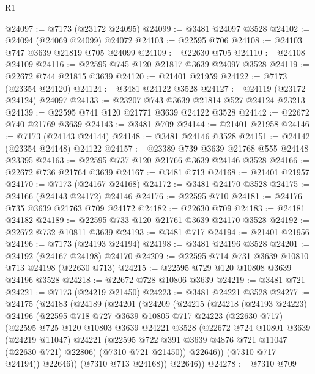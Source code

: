 \begin{lexlean}{R1}
\begin{coremodule}
@24097 := @7173 (@23172 @24095)
@24099 := @3481 @24097 @3528
@24102 := @24094 (@24069 @24099) @24072
@24103 := @22595 @706
@24108 := @24103 @747 @3639 @21819 @705 @24099
@24109 := @22630 @705
@24110 := @24108 @24109
@24116 := @22595 @745 @120 @21817 @3639 @24097 @3528
@24119 := @22672 @744 @21815 @3639
@24120 := @21401 @21959
@24122 := @7173 (@23354 @24120)
@24124 := @3481 @24122 @3528
@24127 := @24119 (@23172 @24124) @24097
@24133 := @23207 @743 @3639 @21814 @527 @24124 @23213
@24139 := @22595 @741 @120 @21771 @3639 @24122 @3528
@24142 := @22672 @740 @21769 @3639
@24143 := @3481 @709
@24144 := @21401 @21958
@24146 := @7173 (@24143 @24144)
@24148 := @3481 @24146 @3528
@24151 := @24142 (@23354 @24148) @24122
@24157 := @23389 @739 @3639 @21768 @555 @24148 @23395
@24163 := @22595 @737 @120 @21766 @3639 @24146 @3528
@24166 := @22672 @736 @21764 @3639
@24167 := @3481 @713
@24168 := @21401 @21957
@24170 := @7173 (@24167 @24168)
@24172 := @3481 @24170 @3528
@24175 := @24166 (@24143 @24172) @24146
@24176 := @22595 @710
@24181 := @24176 @735 @3639 @21763 @709 @24172
@24182 := @22630 @709
@24183 := @24181 @24182
@24189 := @22595 @733 @120 @21761 @3639 @24170 @3528
@24192 := @22672 @732 @10811 @3639
@24193 := @3481 @717
@24194 := @21401 @21956
@24196 := @7173 (@24193 @24194)
@24198 := @3481 @24196 @3528
@24201 := @24192 (@24167 @24198) @24170
@24209 := @22595 @714 @731 @3639 @10810 @713 @24198 (@22630 @713)
@24215 := @22595 @729 @120 @10808 @3639 @24196 @3528
@24218 := @22672 @728 @10806 @3639
@24219 := @3481 @721
@24221 := @7173 (@24219 @21450)
@24223 := @3481 @24221 @3528
@24277 := @24175
    (@24183
      (@24189
        (@24201
          (@24209
            (@24215
              (@24218
                (@24193 @24223)
                @24196
                (@22595
                  @718
                  @727
                  @3639
                  @10805
                  @717
                  @24223
                  (@22630 @717)
                  (@22595
                    @725
                    @120
                    @10803
                    @3639
                    @24221
                    @3528
                    (@22672
                      @724
                      @10801
                      @3639
                      (@24219 @11047)
                      @24221
                      (@22595 @722 @391 @3639 @4876 @721 @11047 (@22630 @721) @22806)
                      (@7310 @721 @21450))
                    @22646))
                (@7310 @717 @24194))
              @22646))
          (@7310 @713 @24168))
        @22646))
@24278 := @7310 @709

\end{coremodule}
\end{lexlean}
